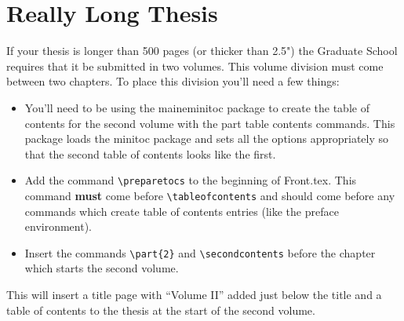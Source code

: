 \section{Really Long Thesis}
If your thesis is longer than 500 pages (or thicker than 2.5") the Graduate School requires that it be submitted in two volumes.  This volume division must come between two chapters.  To place this division you'll need a few things:
\begin{itemize}
\item{You'll need to be using the maineminitoc package to create the table of contents for the second volume with the part table contents commands.  This package loads the minitoc package and sets all the options appropriately so that the second table of contents looks like the first.}
\item{Add the command \verb=\preparetocs= to the beginning of Front.tex.  This command \textbf{must} come before \verb=\tableofcontents= and should come before any commands which create table of contents entries (like the preface environment).}
\item{Insert the commands \verb=\part{2}= and \verb=\secondcontents= before the chapter which starts the second volume.}
\end{itemize}
This will insert a title page with ``Volume II'' added just below the title and a table of contents to the thesis at the start of the second volume.